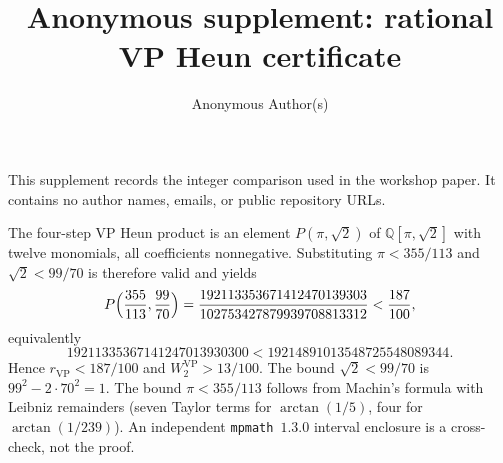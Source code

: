\documentclass{article}
\title{Anonymous supplement: rational VP Heun certificate}
\author{Anonymous Author(s)}
\begin{document}
\maketitle

This supplement records the integer comparison used in the workshop
paper. It contains no author names, emails, or public repository URLs.

The four-step VP Heun product is an element $P(\pi,\sqrt{2})$ of
$\mathbb{Q}[\pi,\sqrt{2}]$ with twelve monomials, all coefficients
nonnegative. Substituting $\pi<355/113$ and $\sqrt{2}<99/70$ is
therefore valid and yields
\[
P\Bigl(\frac{355}{113},\frac{99}{70}\Bigr)
=\frac{192113353671412470139303}{102753427879939708813312}
<\frac{187}{100},
\]
equivalently
\[
19211335367141247013930300<19214891013548725548089344.
\]
Hence $r_{\mathrm{VP}}<187/100$ and $W_2^{\mathrm{VP}}>13/100$.
The bound $\sqrt{2}<99/70$ is $99^2-2\cdot 70^2=1$. The bound
$\pi<355/113$ follows from Machin's formula with Leibniz remainders
(seven Taylor terms for $\arctan(1/5)$, four for $\arctan(1/239)$).
An independent \texttt{mpmath}~$1.3.0$ interval enclosure is a
cross-check, not the proof.
\end{document}
